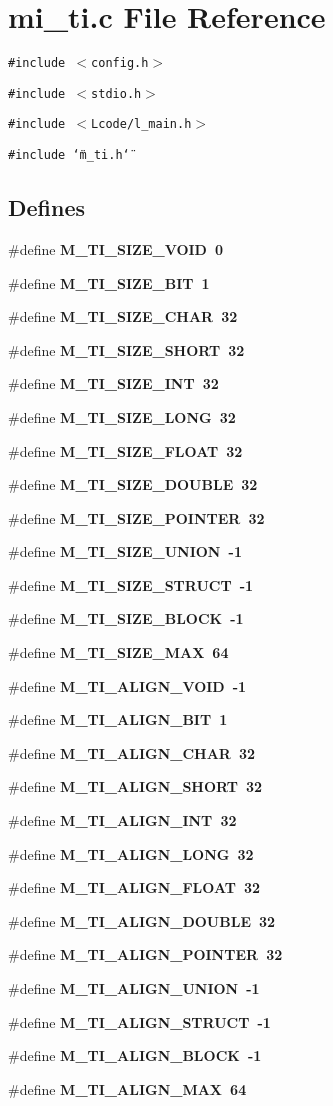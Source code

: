 \section{mi\_\-ti.c File Reference}
\label{mi__ti_8c}
{\tt \#include $<$config.h$>$}\par
{\tt \#include $<$stdio.h$>$}\par
{\tt \#include $<$Lcode/l\_\-main.h$>$}\par
{\tt \#include \char`\"{}m\_\-ti.h\char`\"{}}\par
\subsection*{Defines}
\begin{CompactItemize}
\item 
\#define \bf{M\_\-TI\_\-SIZE\_\-VOID}~0
\item 
\#define \bf{M\_\-TI\_\-SIZE\_\-BIT}~1
\item 
\#define \bf{M\_\-TI\_\-SIZE\_\-CHAR}~32
\item 
\#define \bf{M\_\-TI\_\-SIZE\_\-SHORT}~32
\item 
\#define \bf{M\_\-TI\_\-SIZE\_\-INT}~32
\item 
\#define \bf{M\_\-TI\_\-SIZE\_\-LONG}~32
\item 
\#define \bf{M\_\-TI\_\-SIZE\_\-FLOAT}~32
\item 
\#define \bf{M\_\-TI\_\-SIZE\_\-DOUBLE}~32
\item 
\#define \bf{M\_\-TI\_\-SIZE\_\-POINTER}~32
\item 
\#define \bf{M\_\-TI\_\-SIZE\_\-UNION}~-1
\item 
\#define \bf{M\_\-TI\_\-SIZE\_\-STRUCT}~-1
\item 
\#define \bf{M\_\-TI\_\-SIZE\_\-BLOCK}~-1
\item 
\#define \bf{M\_\-TI\_\-SIZE\_\-MAX}~64
\item 
\#define \bf{M\_\-TI\_\-ALIGN\_\-VOID}~-1
\item 
\#define \bf{M\_\-TI\_\-ALIGN\_\-BIT}~1
\item 
\#define \bf{M\_\-TI\_\-ALIGN\_\-CHAR}~32
\item 
\#define \bf{M\_\-TI\_\-ALIGN\_\-SHORT}~32
\item 
\#define \bf{M\_\-TI\_\-ALIGN\_\-INT}~32
\item 
\#define \bf{M\_\-TI\_\-ALIGN\_\-LONG}~32
\item 
\#define \bf{M\_\-TI\_\-ALIGN\_\-FLOAT}~32
\item 
\#define \bf{M\_\-TI\_\-ALIGN\_\-DOUBLE}~32
\item 
\#define \bf{M\_\-TI\_\-ALIGN\_\-POINTER}~32
\item 
\#define \bf{M\_\-TI\_\-ALIGN\_\-UNION}~-1
\item 
\#define \bf{M\_\-TI\_\-ALIGN\_\-STRUCT}~-1
\item 
\#define \bf{M\_\-TI\_\-ALIGN\_\-BLOCK}~-1
\item 
\#define \bf{M\_\-TI\_\-ALIGN\_\-MAX}~64
\end{CompactItemize}
